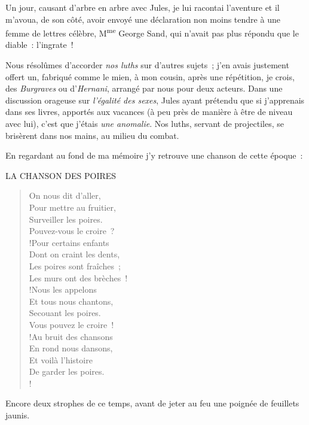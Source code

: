 \documentclass[french,twoside]{book} %
\newenvironment{quoteblock}%
  {\begin{quoting}}
  {\end{quoting}}
\newenvironment{quotebar}{%
    \def\FrameCommand{{\color{rubric!10!}\vrule width 0.5em} \hspace{0.9em}}%
    \def\OuterFrameSep{\itemsep} %
    \MakeFramed {\advance\hsize-\width \FrameRestore}
  }%
  {%
    \endMakeFramed
  }
\renewenvironment{quoteblock}%
  {%
    \savenotes
    \setstretch{0.9}
    \normalfont
    \begin{quotebar}
  }
  {%
    \end{quotebar}
    \spewnotes
  }
\begin{document}
Un jour, causant d’arbre en arbre avec Jules, je lui racontai l’aventure et il m’avoua, de son côté, avoir envoyé une déclaration non moins tendre à une femme de lettres célèbre, M\textsuperscript{me} George Sand, qui n’avait pas plus répondu que le diable : l’ingrate !\par
Nous résolûmes d’accorder \emph{nos luths} sur d’autres sujets ; j’en avais justement offert un, fabriqué comme le mien, à mon cousin, après une répétition, je crois, des \emph{Burgraves} ou d’\emph{Hernani}, arrangé par nous pour deux acteurs. Dans une discussion orageuse sur \emph{l’égalité des sexes}, Jules ayant prétendu que si j’apprenais dans ses livres, apportés aux vacances (à peu près de manière à être de niveau avec lui), c’est que j’étais \emph{une anomalie}. Nos luths, servant de projectiles, se brisèrent dans nos mains, au milieu du combat.\par
En regardant au fond de ma mémoire j’y retrouve une chanson de cette époque :\par
 
\begin{quoteblock}
LA CHANSON DES POIRES\end{quoteblock}

\begin{verse}
On nous dit d’aller,\\
Pour mettre au fruitier,\\
Surveiller les poires.\\
Pouvez-vous le croire ?\\!Pour certains enfants\\
Dont on craint les dents,\\
Les poires sont fraîches ;\\
Les murs ont des brèches !\\!Nous les appelons\\
Et tous nous chantons,\\
Secouant les poires.\\
Vous pouvez le croire !\\!Au bruit des chansons\\
En rond nous dansons,\\
Et voilà l’histoire\\
De garder les poires.\\!
\end{verse}

\noindent Encore deux strophes de ce temps, avant de jeter au feu une poignée de feuillets jaunis.\par
\end{document}
